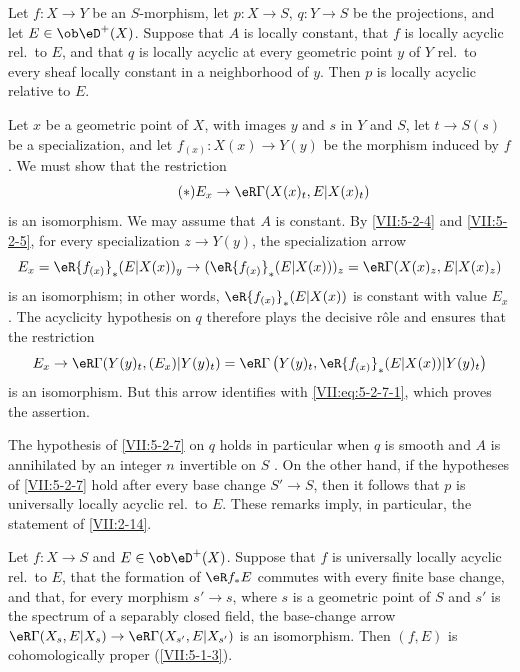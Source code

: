\documentclass[oneside]{book}
\begin{document}
\begin{corollary}\label{VII:5-2-7}
Let $f:X\to Y$ be an $S$-morphism, let $p:X\to S$, $q:Y\to S$ be the
projections, and let $E\in\ob\eD^+(X)$. Suppose that $A$ is locally constant,
that $f$ is locally acyclic rel.\ to $E$, and that $q$ is locally acyclic at
every geometric point $y$ of $Y$ rel.\ to every sheaf locally constant
in a neighborhood of $y$. Then $p$ is locally acyclic relative to $E$.
\end{corollary}

Let $x$ be a geometric point of $X$, with images $y$ and $s$ in $Y$ and $S$,
let $t\to S(s)$ be a specialization, and let
$f_{(x)}:X(x)\to Y(y)$ be the morphism induced by $f$. We must show that the
restriction
\begin{equation*}\tag{$*$}\label{VII:eq:5-2-7-1}
  E_x \to \eR\Gamma(X(x)_t,E|X(x)_t) 
\end{equation*}
is an isomorphism. We may assume that $A$ is constant. By \ref{VII:5-2-4} and
\ref{VII:5-2-5}, for every specialization $z\to Y(y)$, the specialization
arrow
\[
  E_x = \eR {f_{(x)}}_\ast (E|X(x))_y \to (\eR {f_{(x)}}_\ast (E|X(x)))_z = \eR\Gamma(X(x)_z,E|X(x)_z) 
\]
is an isomorphism; in other words, $\eR{f_{(x)}}_\ast(E|X(x))$ is constant
with value $E_x$. The acyclicity hypothesis on $q$ therefore plays the
decisive r\^ole and ensures that the restriction
\[
  E_x \to \eR\Gamma(Y(y)_t,(E_x)|Y(y)_t) = \eR\Gamma\left(Y(y)_t,\eR {f_{(x)}}_\ast (E|X(x))|Y(y)_t\right)
\]
is an isomorphism. But this arrow identifies with
\eqref{VII:eq:5-2-7-1}, which proves the assertion.

The hypothesis of \ref{VII:5-2-7} on $q$ holds in particular when $q$ is
smooth and $A$ is annihilated by an integer $n$ invertible on $S$
\cite[XV]{sga4}. On the other hand, if the hypotheses of \ref{VII:5-2-7} hold
after every base change $S'\to S$, then it follows that $p$ is universally
locally acyclic rel.\ to $E$. These remarks imply, in particular, the
statement of \ref{VII:2-14}.






\begin{corollary}\label{VII:5-2-8}
Let $f:X\to S$ and $E\in \ob\eD^+(X)$. Suppose that $f$ is universally locally
acyclic rel.\ to $E$, that the formation of $\eR f_\ast E$ commutes with
every finite base change, and that, for every morphism $s'\to s$, where $s$ is
a geometric point of $S$ and $s'$ is the spectrum of a separably closed
field, the base-change arrow
$\eR\Gamma(X_s,E|X_s)\to \eR\Gamma(X_{s'},E|X_{s'})$ is an isomorphism. Then
$(f,E)$ is cohomologically proper (\ref{VII:5-1-3}).
\end{corollary}
\end{document}
